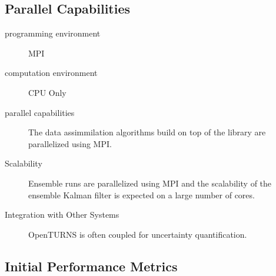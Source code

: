 \subsection{Parallel Capabilities}
\label{sec:WP4:Feel++:performances}


\begin{description}
    \item[programming environment] MPI
    \item[computation environment] CPU Only
    \item[parallel capabilities] The data assimmilation algorithms build on top of the \Feelpp library are parallelized using MPI.
    \item[Scalability] Ensemble runs are parallelized using MPI and the scalability of the ensemble Kalman filter is expected on a large number of cores.
    \item[Integration with Other Systems] OpenTURNS is often coupled for uncertainty quantification.
\end{description}

\subsection{Initial Performance Metrics}
\label{sec:WP4:Feel++:metrics}


